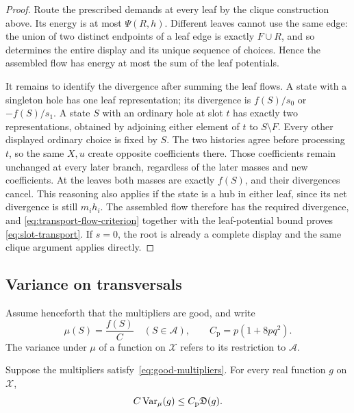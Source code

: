 \begin{proof}
Route the prescribed demands at every leaf by the clique construction
above. Its energy is at most $\Psi(R,h)$.
Different leaves cannot use the same edge: the union of two distinct
endpoints of a leaf edge is exactly $F\cup R$, and so determines the
entire display and its unique sequence of choices. Hence the assembled
flow has energy at most the sum of the leaf potentials.

It remains to identify the divergence after summing the leaf flows.
A state with a singleton hole has one leaf representation; its
divergence is $f(S)/s_0$ or $-f(S)/s_1$.
A state $S$ with an ordinary hole at slot $t$ has exactly two
representations, obtained by adjoining either element of $t$ to
$S\setminus F$. Every other displayed ordinary choice is fixed by
$S$. The two histories agree before processing $t$, so the same
$X,u$ create opposite coefficients there. Those coefficients remain
unchanged at every later branch, regardless of the later masses and
new coefficients. At the leaves both masses are exactly $f(S)$,
and their divergences cancel. This reasoning also applies if the
state is a hub in either leaf, since its net divergence is still
$m_i h_i$.
The assembled flow therefore has the required divergence, and
\eqref{eq:transport-flow-criterion} together with the leaf-potential
bound proves \eqref{eq:slot-transport}. If $s=0$, the root is already
a complete display and the same clique argument applies directly.
\end{proof}

\subsection{Variance on transversals}

Assume henceforth that the multipliers are good, and write
\[
  \mu(S)=\frac{f(S)}{C}\quad(S\in\mathcal A),
  \qquad C_{\mathrm p}=p(1+8pq^2).
\]
The variance under $\mu$ of a function on $\mathcal X$ refers to its
restriction to $\mathcal A$.

\begin{proposition}
\label{prop:transversal-variance}
Suppose the multipliers satisfy~\eqref{eq:good-multipliers}.
For every real function $g$ on $\mathcal X$,
\begin{equation}
    C\operatorname{Var}_\mu(g)\leq C_{\mathrm p}\mathfrak D(g).
    \label{eq:transversal-variance}
\end{equation}
\end{proposition}

